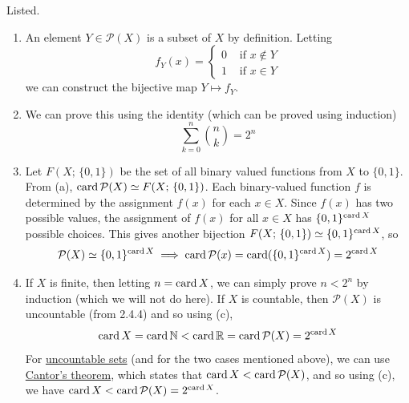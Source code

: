   \begin{solution}
    Listed. 
    \begin{enumerate}
      \item An element $Y \in \mathcal{P}(X)$ is a subset of $X$ by definition. Letting 
      \begin{equation}
        f_Y (x) = \begin{cases} 0 & \text{ if } x \not\in Y \\
              1 & \text{ if } x \in Y \end{cases}
      \end{equation}
      we can construct the bijective map $Y \mapsto f_Y$. 
      \item We can prove this using the identity (which can be proved using induction) 
        \begin{equation}
          \sum_{k=0}^n \binom{n}{k} = 2^n
        \end{equation}
      \item Let $F(X; \, \{0, 1\})$ be the set of all binary valued functions from $X$ to $\{0, 1\}$. From (a), $\operatorname*{card}{\mathcal{P}(X)} \simeq F(X; \, \{0, 1\})$. Each binary-valued function $f$ is determined by the assignment $f(x)$ for each $x \in X$. Since $f(x)$ has two possible values, the assignment of $f(x)$ for all $x \in X$ has $\{0, 1\}^{\operatorname*{card}{X}}$ possible choices. This gives another bijection $F(X; \, \{0, 1\}) \simeq \{0, 1\}^{\operatorname*{card}{X}}$, so 
      \begin{equation}
        \mathcal{P}(X) \simeq \{0, 1\}^{\operatorname*{card}{X}} \implies \operatorname*{card}{\mathcal{P}(x)} = \operatorname*{card}(\{0, 1\}^{\operatorname*{card}{X}}) = 2^{\operatorname*{card}{X}}
      \end{equation}
      \item If $X$ is finite, then letting $n = \operatorname*{card}{X}$, we can simply prove $n < 2^n$ by induction (which we will not do here). If $X$ is countable, then $\mathcal{P}(X)$ is uncountable (from 2.4.4) and so using (c), 
      \begin{equation}
        \operatorname*{card}{X} = \operatorname*{card}{\mathbb{N}} < \operatorname*{card}{\mathbb{R}} = \operatorname*{card}{\mathcal{P}(X)} = 2^{\operatorname*{card}{X}}
      \end{equation}
      For \hyperref[st-def:uncountable-set]{uncountable sets} (and for the two cases mentioned above), we can use \hyperref[st-thm:cantors-theorem]{Cantor's theorem}, which states that $\operatorname*{card}{X} < \operatorname*{card}{\mathcal{P}(X)}$, and so using (c), we have $\operatorname*{card}{X} < \operatorname*{card}{\mathcal{P}(X)} = 2^{\operatorname*{card}{X}}$. 
    \end{enumerate}
  \end{solution}


